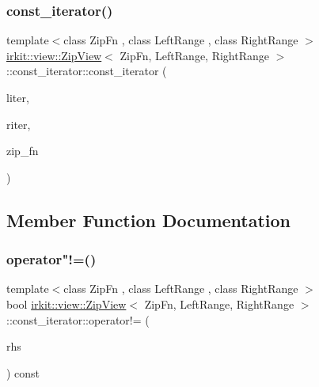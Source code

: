 \subsubsection{\texorpdfstring{const\+\_\+iterator()}{const\_iterator()}}
{\footnotesize\ttfamily template$<$class Zip\+Fn , class Left\+Range , class Right\+Range $>$ \\
\hyperlink{classirkit_1_1view_1_1ZipView}{irkit\+::view\+::\+Zip\+View}$<$ Zip\+Fn, Left\+Range, Right\+Range $>$\+::const\+\_\+iterator\+::const\+\_\+iterator (\begin{DoxyParamCaption}\item[{\hyperlink{namespaceirkit_a4b1668583041117eb42c1b5a1091b804}{const\+\_\+iterator\+\_\+t}$<$ Left\+Range $>$}]{liter,  }\item[{\hyperlink{namespaceirkit_a4b1668583041117eb42c1b5a1091b804}{const\+\_\+iterator\+\_\+t}$<$ Right\+Range $>$}]{riter,  }\item[{Zip\+Fn}]{zip\+\_\+fn }\end{DoxyParamCaption})\hspace{0.3cm}{\ttfamily [inline]}}



\subsection{Member Function Documentation}
\mbox{\label{classirkit_1_1view_1_1ZipView_1_1const__iterator_a64c38c56be6d9bbe7486b97f651c38d4}} 
\subsubsection{\texorpdfstring{operator"!=()}{operator!=()}}
{\footnotesize\ttfamily template$<$class Zip\+Fn , class Left\+Range , class Right\+Range $>$ \\
bool \hyperlink{classirkit_1_1view_1_1ZipView}{irkit\+::view\+::\+Zip\+View}$<$ Zip\+Fn, Left\+Range, Right\+Range $>$\+::const\+\_\+iterator\+::operator!= (\begin{DoxyParamCaption}\item[{const \hyperlink{classirkit_1_1view_1_1ZipView_1_1const__iterator}{const\+\_\+iterator} \&}]{rhs }\end{DoxyParamCaption}) const\hspace{0.3cm}{\ttfamily [inline]}}

